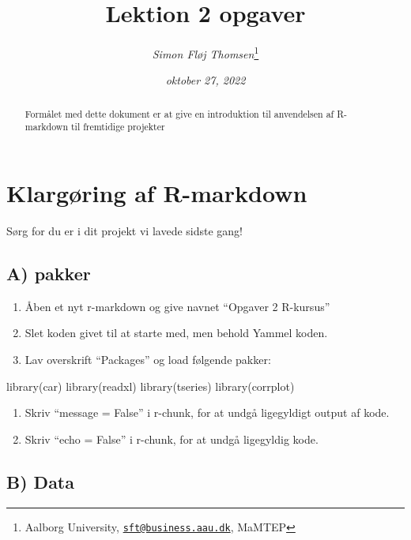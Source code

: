 \documentclass[
  12pt,
]{article}
\title{Lektion 2 opgaver}
\author{\emph{Simon Fløj Thomsen}\footnote{Aalborg University,
  \href{mailto:sft@business.aau.dk}{\nolinkurl{sft@business.aau.dk}},
  MaMTEP}}
\date{\emph{oktober 27, 2022}}
\newenvironment{Shaded}{\begin{snugshade}}{\end{snugshade}}
\newcommand{\FunctionTok}[1]{\textcolor[rgb]{0.00,0.00,0.00}{#1}}
\newcommand{\NormalTok}[1]{#1}
\providecommand{\tightlist}{%
  \setlength{\itemsep}{0pt}\setlength{\parskip}{0pt}}
\begin{document}
\maketitle
\begin{abstract}
\begingroup Formålet med dette dokument er at give en introduktion til
anvendelsen af R-markdown til fremtidige projekter \endgroup
\end{abstract}

\hypertarget{klarguxf8ring-af-r-markdown}{%
\section{Klargøring af R-markdown}\label{klarguxf8ring-af-r-markdown}}

Sørg for du er i dit projekt vi lavede sidste gang!

\hypertarget{a-pakker}{%
\subsection{A) pakker}\label{a-pakker}}

\begin{enumerate}
\def\labelenumi{\arabic{enumi}.}
\tightlist
\item
  Åben et nyt r-markdown og give navnet ``Opgaver 2 R-kursus''
\item
  Slet koden givet til at starte med, men behold Yammel koden.
\item
  Lav overskrift ``Packages'' og load følgende pakker:
\end{enumerate}

\begin{Shaded}
\begin{Highlighting}[]
\FunctionTok{library}\NormalTok{(car)}
\FunctionTok{library}\NormalTok{(readxl)}
\FunctionTok{library}\NormalTok{(tseries)}
\FunctionTok{library}\NormalTok{(corrplot)}
\end{Highlighting}
\end{Shaded}

\begin{enumerate}
\def\labelenumi{\arabic{enumi}.}
\setcounter{enumi}{3}
\tightlist
\item
  Skriv ``message = False'' i r-chunk, for at undgå ligegyldigt output
  af kode.
\item
  Skriv ``echo = False'' i r-chunk, for at undgå ligegyldig kode.
\end{enumerate}

\hypertarget{b-data}{%
\subsection{B) Data}\label{b-data}}
\end{document}
